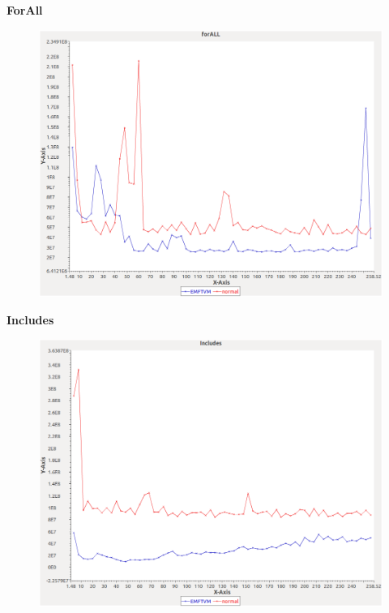 \noindent\textbf{ForAll}

\begin{figure}[h]
\centering
\includegraphics[width=\textwidth]{../graphs/set/forALL}
\end{figure}
\pagebreak

\noindent\textbf{Includes}

\begin{figure}[h]
\centering
\includegraphics[width=\textwidth]{../graphs/set/Includes}
\end{figure}
\pagebreak

